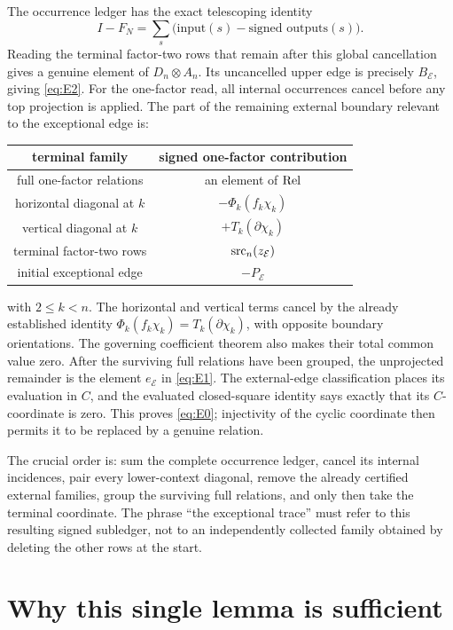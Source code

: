 \documentclass[11pt]{article}
\newcommand{\Rel}{\mathop{\rm Rel}}
\newcommand{\src}{\mathop{\rm src}}
\begin{document}
The occurrence ledger has the exact telescoping identity
\[
 I-F_N=\sum_s\bigl(\text{input}(s)-\text{signed outputs}(s)\bigr).
\]
Reading the terminal factor-two rows that remain after this global
cancellation gives a genuine element of $D_n\otimes A_n$.  Its uncancelled
upper edge is precisely $B_{\mathcal E}$, giving \eqref{eq:E2}.  For the
one-factor read, all internal occurrences cancel before any top projection is
applied.  The part of the remaining external boundary relevant to the
exceptional edge is:
\begin{center}
\begin{tabular}{c|c}
terminal family & signed one-factor contribution\\ \hline
full one-factor relations & an element of \(\Rel\)\\
horizontal diagonal at \(k\) & \(-\Phi_k(f_k\chi_k)\)\\
vertical diagonal at \(k\) & \(+T_k(\partial\chi_k)\)\\
terminal factor-two rows & \(\src_n(z_{\mathcal E})\)\\
initial exceptional edge & \(-P_{\mathcal E}\)
\end{tabular}
\end{center}
with $2\leq k<n$.  The horizontal and vertical terms cancel by the
already established identity
$\Phi_k(f_k\chi_k)=T_k(\partial\chi_k)$, with opposite boundary
orientations.  The governing coefficient theorem also makes their total
common value zero.  After the surviving full relations have been grouped,
the unprojected remainder is the element $e_{\mathcal E}$ in
\eqref{eq:E1}.  The external-edge classification places its evaluation in
$C$, and the evaluated closed-square identity says exactly that its
$C$-coordinate is zero.  This proves \eqref{eq:E0}; injectivity of the cyclic
coordinate then permits it to be replaced by a genuine relation.

The crucial order is: sum the complete occurrence ledger, cancel its
internal incidences, pair every lower-context diagonal, remove the already
certified external families, group the surviving full relations, and only
then take the terminal coordinate.  The phrase ``the exceptional trace''
must refer to this resulting signed subledger, not to an independently
collected family obtained by deleting the other rows at the start.

\section{Why this single lemma is sufficient}
\end{document}
